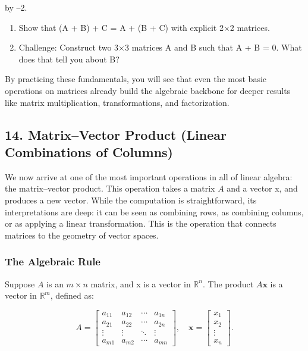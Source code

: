 \documentclass[
  letterpaper,
  DIV=11,
  numbers=noendperiod]{scrreprt}
\begin{document}
by --2.

\begin{enumerate}
\def\labelenumi{\arabic{enumi}.}
\setcounter{enumi}{2}
\item
  Show that (A + B) + C = A + (B + C) with explicit 2×2 matrices.
\item
  Challenge: Construct two 3×3 matrices A and B such that A + B = 0.
  What does that tell you about B?
\end{enumerate}

By practicing these fundamentals, you will see that even the most basic
operations on matrices already build the algebraic backbone for deeper
results like matrix multiplication, transformations, and factorization.

\subsection{14. Matrix--Vector Product (Linear Combinations of
Columns)}\label{matrixvector-product-linear-combinations-of-columns}

We now arrive at one of the most important operations in all of linear
algebra: the matrix--vector product. This operation takes a matrix \(A\)
and a vector x, and produces a new vector. While the computation is
straightforward, its interpretations are deep: it can be seen as
combining rows, as combining columns, or as applying a linear
transformation. This is the operation that connects matrices to the
geometry of vector spaces.

\subsubsection{The Algebraic Rule}\label{the-algebraic-rule}

Suppose \(A\) is an \(m \times n\) matrix, and x is a vector in
\(\mathbb{R}^n\). The product \(A\mathbf{x}\) is a vector in
\(\mathbb{R}^m\), defined as:

\[
A = 
\begin{bmatrix} 
a_{11} & a_{12} & \cdots & a_{1n} \\ 
a_{21} & a_{22} & \cdots & a_{2n} \\ 
\vdots & \vdots & \ddots & \vdots \\ 
a_{m1} & a_{m2} & \cdots & a_{mn} 
\end{bmatrix}, 
\quad
\mathbf{x} = 
\begin{bmatrix} 
x_1 \\ x_2 \\ \vdots \\ x_n
\end{bmatrix}.
\]
\end{document}
